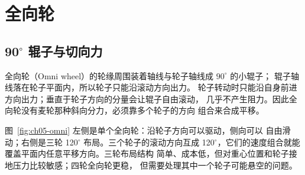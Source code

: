 \section{全向轮}

\subsection{90$^\circ$ 辊子与切向力}

全向轮（Omni wheel）的轮缘周围装着轴线与轮子轴线成 $90^\circ$ 的小辊子；
辊子轴线落在轮子平面内，所以轮子只能沿滚动方向出力。
轮子转动时只能沿自身前进方向出力；垂直于轮子方向的分量会让辊子自由滚动，
几乎不产生阻力。因此全向轮没有麦轮那种斜向分力，必须靠多个轮子的方向
组合来合成平移。

图~\ref{fig:ch05-omni} 左侧是单个全向轮：沿轮子方向可以驱动，侧向可以
自由滑动；右侧是三轮 120$^\circ$ 布局。三个轮子的滚动方向互成
120$^\circ$，它们的速度组合就能覆盖平面内任意平移方向。三轮布局结构
简单、成本低，但对重心位置和轮子接地压力比较敏感；四轮全向轮更稳，
但需要处理其中一个轮子可能悬空的问题。

